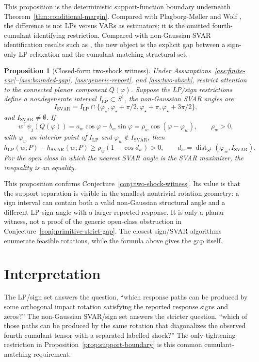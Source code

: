 \documentclass[11pt]{article}
\newcommand{\transpose}{\mathsf{T}}
\theoremstyle{definition}
\theoremstyle{plain}
\newtheorem{proposition}{Proposition}
\theoremstyle{remark}
\begin{document}
This proposition is the deterministic support-function boundary underneath
Theorem~\ref{thm:conditional-margin}.  Compared with Plagborg-M{\o}ller and Wolf
\cite{PlagborgMollerWolf2021}, the difference is not LPs versus VARs as
estimators; it is the omitted fourth-cumulant identifying restriction.  Compared
with non-Gaussian SVAR identification results such as
\cite{GourierouxMonfortRenne2017,LanneMeitzSaikkonen2017,Guay2021}, the new
object is the explicit gap between a sign-only LP relaxation and the
cumulant-matching structural set.

\begin{proposition}[Closed-form two-shock witness]\label{prop:two-shock}
Under Assumptions~\ref{ass:finite-var}--\ref{ass:bounded-gap},
\ref{ass:generic-report}, and \ref{ass:two-shock}, restrict attention to the
connected planar component \(Q(\varphi)\).  Suppose the LP/sign restrictions
define a nondegenerate interval \(I_{\mathrm{LP}}\subset S^1\), the
non-Gaussian SVAR angles are
\[
I_{\mathrm{SVAR}}=
I_{\mathrm{LP}}\cap
\{\varphi_\star,\varphi_\star+\pi/2,\varphi_\star+\pi,
\varphi_\star+3\pi/2\},
\]
and \(I_{\mathrm{SVAR}}\ne\emptyset\).  If
\[
w^\transpose\psi_j(Q(\varphi))
=a_w\cos\varphi+b_w\sin\varphi
=\rho_w\cos(\varphi-\varphi_w),\qquad \rho_w>0,
\]
with \(\varphi_w\) an interior point of \(I_{\mathrm{LP}}\) and
\(\varphi_w\notin I_{\mathrm{SVAR}}\), then
\[
h_{\mathrm{LP}}(w;P)-h_{\mathrm{SVAR}}(w;P)
\ge \rho_w(1-\cos d_w)>0,
\qquad d_w=\operatorname{dist}_{S^1}(\varphi_w,I_{\mathrm{SVAR}}).
\]
For the open class in which the nearest SVAR angle is the SVAR maximizer, the
inequality is an equality.
\end{proposition}

This proposition confirms Conjecture~\ref{conj:two-shock-witness}.  Its value
is that the support separation is visible in the smallest nontrivial rotation
geometry: a sign interval can contain both a valid non-Gaussian structural
angle and a different LP-sign angle with a larger reported response.  It is
only a planar witness, not a proof of the generic open-class obstruction in
Conjecture~\ref{conj:primitive-strict-gap}.  The closest sign/SVAR algorithms
enumerate feasible rotations, while the formula above gives the gap itself.

\section{Interpretation}
The LP/sign set answers the question, ``which response paths can be produced by
some orthogonal impact rotation satisfying the reported response signs and
zeros?''  The non-Gaussian SVAR/sign set answers the stricter question, ``which
of those paths can be produced by the same rotation that diagonalizes the
observed fourth cumulant tensor with a separated labelled shock?''  The only
tightening restriction in Proposition~\ref{prop:support-boundary} is this
common cumulant-matching requirement.
\end{document}

